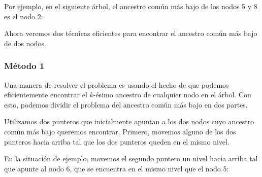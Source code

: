 Por ejemplo, en el siguiente árbol, el ancestro común más bajo de
los nodos 5 y 8 es el nodo 2:
\begin{center}
\end{center}

Ahora veremos dos técnicas eficientes para encontrar el ancestro
común más bajo de dos nodos.

\subsubsection{Método 1}

Una manera de resolver el problema es usando el hecho de que podemos
eficientemente encontrar el $k$-ésimo ancestro de cualquier nodo en el
árbol. Con esto, podemos dividir el problema del ancestro común más
bajo en dos partes.

Utilizamos dos punteros que inicialmente apuntan a los dos nodos cuyo
ancestro común más bajo queremos encontrar. Primero, movemos alguno de
los dos punteros hacia arriba tal que los dos punteros queden en el
mismo nivel.

En la situación de ejemplo, movemos el segundo puntero un nivel hacia
arriba tal que apunte al nodo 6, que se encuentra en el mismo nivel
que el nodo 5:

